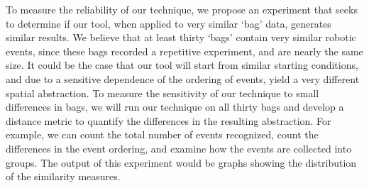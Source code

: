 To measure the reliability of our technique, we propose an experiment that seeks to determine if our tool, when applied to very similar `bag' data, generates similar results.
We believe that at least thirty `bags' contain very similar robotic events, since these bags recorded a repetitive experiment, and are nearly the same size.
It could be the case that our tool will start from similar starting conditions, and due to a sensitive dependence of the ordering of events, yield a very different spatial abstraction.
To measure the sensitivity of our technique to small differences in bags, we will run our technique on all thirty bags and develop a distance metric to quantify the differences in the resulting abstraction.
For example, we can count the total number of events recognized, count the differences in the event ordering, and examine how the events are collected into groups.
The output of this experiment would be graphs showing the distribution of the similarity measures.




